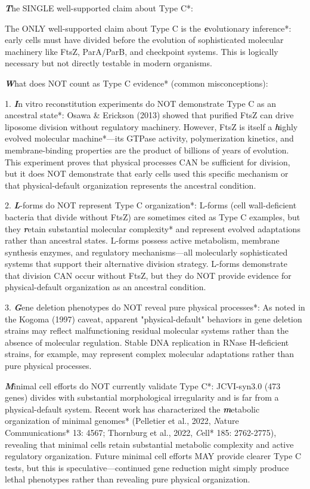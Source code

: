 \documentclass[11pt,a4paper]{article}
\begin{document}
\textbf\textit*The SINGLE well-supported claim about Type C*:

The ONLY well-supported claim about Type C is the \textbf\textit*evolutionary inference*: early cells must have divided before the evolution of sophisticated molecular machinery like FtsZ, ParA/ParB, and checkpoint systems. This is logically necessary but not directly testable in modern organisms.

\textbf\textit*What does NOT count as Type C evidence* (common misconceptions):

1. \textbf\textit*In vitro reconstitution experiments do NOT demonstrate Type C as an ancestral state*: Osawa & Erickson (2013) showed that purified FtsZ can drive liposome division without regulatory machinery. However, FtsZ is itself a \textbf\textit*highly evolved molecular machine*—its GTPase activity, polymerization kinetics, and membrane-binding properties are the product of billions of years of evolution. This experiment proves that physical processes CAN be sufficient for division, but it does NOT demonstrate that early cells used this specific mechanism or that physical-default organization represents the ancestral condition.

2. \textbf\textit*L-forms do NOT represent Type C organization*: L-forms (cell wall-deficient bacteria that divide without FtsZ) are sometimes cited as Type C examples, but they \textbf\textit*retain substantial molecular complexity* and represent evolved adaptations rather than ancestral states. L-forms possess active metabolism, membrane synthesis enzymes, and regulatory mechanisms—all molecularly sophisticated systems that support their alternative division strategy. L-forms demonstrate that division CAN occur without FtsZ, but they do NOT provide evidence for physical-default organization as an ancestral condition.

3. \textbf\textit*Gene deletion phenotypes do NOT reveal pure physical processes*: As noted in the Kogoma (1997) caveat, apparent "physical-default" behaviors in gene deletion strains may reflect malfunctioning residual molecular systems rather than the absence of molecular regulation. Stable DNA replication in RNase H-deficient strains, for example, may represent complex molecular adaptations rather than pure physical processes.

\textbf\textit*Minimal cell efforts do NOT currently validate Type C*: JCVI-syn3.0 (473 genes) divides with substantial morphological irregularity and is far from a physical-default system. Recent work has characterized the \textbf\textit*metabolic organization of minimal genomes* (Pelletier et al., 2022, \textit*Nature Communications* 13: 4567; Thornburg et al., 2022, \textit*Cell* 185: 2762-2775), revealing that minimal cells retain substantial metabolic complexity and active regulatory organization. Future minimal cell efforts MAY provide clearer Type C tests, but this is speculative—continued gene reduction might simply produce lethal phenotypes rather than revealing pure physical organization.
\end{document}
